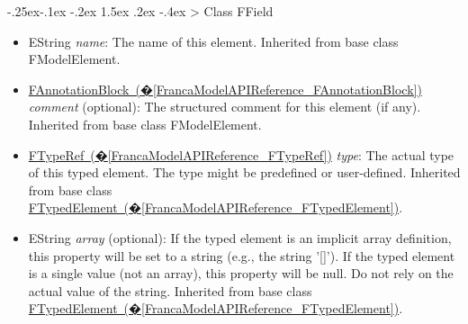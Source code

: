 \documentclass[a4paper,10pt]{scrreprt}
\makeatletter
\renewcommand\subsection{\medskip\@startsection{subsection}{2}{\z@}%
  {-.25ex\@plus -.1ex \@minus -.2ex}%
  {1.5ex \@plus .2ex \@minus -.4ex}%
  {\ifnum \scr@compatibility>\@nameuse{scr@v@2.96}\relax
    \setlength{\parfillskip}{\z@ plus 1fil}\fi
    \raggedsection\normalfont\sectfont\nobreak\size@subsection
  }%
}
\newlength{\XdocItemIndent}
\makeatother
\begin{document}
\subsection{Class FField}
\label{FrancaModelAPIReference_FField}
\setlength{\XdocItemIndent}{\textwidth}
\begin{itemize}
\addtolength{\XdocItemIndent}{-2.5em}
\item \begin{minipage}[t]{\XdocItemIndent}
EString \textit{name}: The name of this element.
		 Inherited from base class FModelElement.

\end{minipage}
\item \begin{minipage}[t]{\XdocItemIndent}
\hyperref[FrancaModelAPIReference_FAnnotationBlock]{FAnnotationBlock~(�\ref*{FrancaModelAPIReference_FAnnotationBlock})} \textit{comment} (optional): The structured comment for this element (if any).
		 Inherited from base class FModelElement.

\end{minipage}
\item \begin{minipage}[t]{\XdocItemIndent}
\hyperref[FrancaModelAPIReference_FTypeRef]{FTypeRef~(�\ref*{FrancaModelAPIReference_FTypeRef})} \textit{type}: The actual type of this typed element. The type might be predefined or user-defined.
		 Inherited from base class \hyperref[FrancaModelAPIReference_FTypedElement]{FTypedElement~(�\ref*{FrancaModelAPIReference_FTypedElement})}.

\end{minipage}
\item \begin{minipage}[t]{\XdocItemIndent}
EString \textit{array} (optional): If the typed element is an implicit array definition, this property will be set to a string (e.g., the string '[]'). If the typed element is a single value (not an array), this property will be null. Do not rely on the actual value of the string.
		 Inherited from base class \hyperref[FrancaModelAPIReference_FTypedElement]{FTypedElement~(�\ref*{FrancaModelAPIReference_FTypedElement})}.

\end{minipage}
\end{itemize}
\addtolength{\XdocItemIndent}{2.5em}
\end{document}

